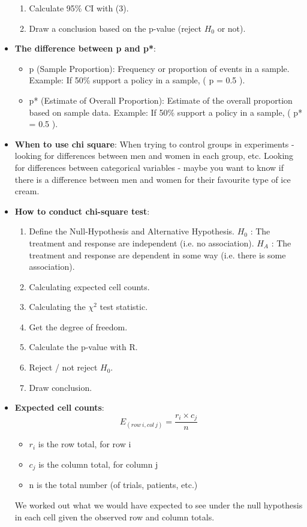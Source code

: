 \documentclass[12pt]{article}
\begin{document}
\begin{itemize}
\begin{enumerate}
\item Calculate 95\% CI with (3).
\item Draw a conclusion based on the p-value (reject $H_0$ or not).
\end{enumerate}
\item \textbf{The difference between p and p*}:
\begin{itemize}
\item p (Sample Proportion): Frequency or proportion of events in a sample. Example: If 50\% support a policy in a sample, ( p = 0.5 ).
\item p* (Estimate of Overall Proportion): Estimate of the overall proportion based on sample data. Example: If 50\% support a policy in a sample, ( p* = 0.5 ).
\end{itemize}
\item \textbf{When to use chi square}: When trying to control groups in experiments - looking for differences between men and women in each group, etc. Looking for differences between categorical variables - maybe you want to know if there is a difference between men and women for their favourite type of ice cream.
\item \textbf{How to conduct chi-square test}:
\begin{enumerate}
\item Define the Null-Hypothesis and Alternative Hypothesis. $H_0$ : The treatment and response are independent (i.e. no association). $H_A$ : The treatment and response are dependent in some way (i.e. there is some association).
\item Calculating expected cell counts.
\item Calculating the $\chi^2$ test statistic.
\item Get the degree of freedom.
\item Calculate the p-value with R.
\item Reject / not reject $H_0$.
\item Draw conclusion.
\end{enumerate}
\item \textbf{Expected cell counts}: 
$$E_{(row \ i, col \ j)} = \frac{r_i \times c_j}{n}$$
\begin{itemize}
\item $r_i$ is the row total, for row i
\item $c_j$ is the column total, for column j 
\item n is the total number (of trials, patients, etc.)
\end{itemize}
We worked out what we would have expected to see under the null hypothesis in each cell given the observed row and column totals.

\end{itemize}
\end{document}
